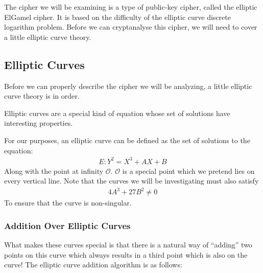 \documentclass[12pt, a4paper, draft]{report}
\begin{document}
The cipher we will be examining is a type of public-key cipher, called
the elliptic ElGamel cipher. It is based on the difficulty of the
elliptic curve discrete logarithm problem. Before we can cryptanalyse this
cipher, we will need to cover a little elliptic curve theory.


\subsection{Elliptic Curves}

Before we can properly describe the cipher we will be analyzing, a little elliptic
curve theory is in order.

Elliptic curves are a special kind of equation whose set of solutions have interesting
properties.

For our purposes, an elliptic curve can be defined as the set of solutions
to the equation:
\begin{align*}
    E:Y^2 = X^3 + AX + B
\end{align*}
Along with the point at infinity $\mathcal{O}$. $\mathcal{O}$ is a special
point which we pretend lies on every vertical line. Note that the curves
we will be investigating must also satisfy
\begin{align*}
    4A^3 + 27B^2 \neq 0
\end{align*}
To ensure that the curve is non-singular.


\subsubsection{Addition Over Elliptic Curves}

What makes these curves special is that there is a natural way of ``adding''
two points on this curve which always results in a third point which is also on
the curve! The elliptic curve addition algorithm is as follows:
\end{document}
